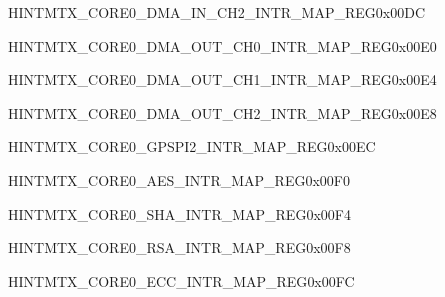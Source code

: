 \begin{register}{H}{INTMTX\_CORE0\_DMA\_IN\_CH2\_INTR\_MAP\_REG}{0x00DC}\label{regdesc:INTMTXCORE0DMAINCH2INTRMAPREG}
\end{register}\vspace{-3em}


\begin{register}{H}{INTMTX\_CORE0\_DMA\_OUT\_CH0\_INTR\_MAP\_REG}{0x00E0}\label{regdesc:INTMTXCORE0DMAOUTCH0INTRMAPREG}
\end{register}\vspace{-3em}


\begin{register}{H}{INTMTX\_CORE0\_DMA\_OUT\_CH1\_INTR\_MAP\_REG}{0x00E4}\label{regdesc:INTMTXCORE0DMAOUTCH1INTRMAPREG}
\end{register}\vspace{-3em}


\begin{register}{H}{INTMTX\_CORE0\_DMA\_OUT\_CH2\_INTR\_MAP\_REG}{0x00E8}\label{regdesc:INTMTXCORE0DMAOUTCH2INTRMAPREG}
\end{register}\vspace{-3em}


\begin{register}{H}{INTMTX\_CORE0\_GPSPI2\_INTR\_MAP\_REG}{0x00EC}\label{regdesc:INTMTXCORE0GPSPI2INTRMAPREG}
\end{register}\vspace{-3em}


\begin{register}{H}{INTMTX\_CORE0\_AES\_INTR\_MAP\_REG}{0x00F0}\label{regdesc:INTMTXCORE0AESINTRMAPREG}
\end{register}\vspace{-3em}


\begin{register}{H}{INTMTX\_CORE0\_SHA\_INTR\_MAP\_REG}{0x00F4}\label{regdesc:INTMTXCORE0SHAINTRMAPREG}
\end{register}\vspace{-3em}


\begin{register}{H}{INTMTX\_CORE0\_RSA\_INTR\_MAP\_REG}{0x00F8}\label{regdesc:INTMTXCORE0RSAINTRMAPREG}
\end{register}\vspace{-3em}


\begin{register}{H}{INTMTX\_CORE0\_ECC\_INTR\_MAP\_REG}{0x00FC}\label{regdesc:INTMTXCORE0ECCINTRMAPREG}
\end{register}\vspace{-3em}


